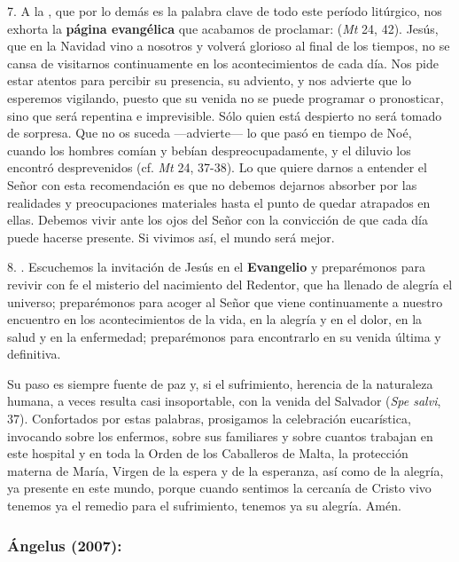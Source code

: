 \begin{body}
					7. A la , que por lo demás es la palabra clave de todo este período litúrgico, nos exhorta la \textbf{página evangélica} que acabamos de proclamar:  (\emph{Mt} 24, 42). Jesús, que en la Navidad vino a nosotros y volverá glorioso al final de los tiempos, no se cansa de visitarnos continuamente en los acontecimientos de cada día. Nos pide estar atentos para percibir su presencia, su adviento, y nos advierte que lo esperemos vigilando, puesto que su venida no se puede programar o pronosticar, sino que será repentina e imprevisible. Sólo quien está despierto no será tomado de sorpresa. Que no os suceda ---advierte--- lo que pasó en tiempo de Noé, cuando los hombres comían y bebían despreocupadamente, y el diluvio los encontró desprevenidos (cf. \emph{Mt} 24, 37-38). Lo que quiere darnos a entender el Señor con esta recomendación es que no debemos dejarnos absorber por las realidades y preocupaciones materiales hasta el punto de quedar atrapados en ellas. Debemos vivir ante los ojos del Señor con la convicción de que cada día puede hacerse presente. Si vivimos así, el mundo será mejor. 
					
					8. . Escuchemos la invitación de Jesús en el \textbf{Evangelio} y preparémonos para revivir con fe el misterio del nacimiento del Redentor, que ha llenado de alegría el universo; preparémonos para acoger al Señor que viene continuamente a nuestro encuentro en los acontecimientos de la vida, en la alegría y en el dolor, en la salud y en la enfermedad; preparémonos para encontrarlo en su venida última y definitiva. 
					
					Su paso es siempre fuente de paz y, si el sufrimiento, herencia de la naturaleza humana, a veces resulta casi insoportable, con la venida del Salvador  (\emph{Spe salvi}, 37). Confortados por estas palabras, prosigamos la celebración eucarística, invocando sobre los enfermos, sobre sus familiares y sobre cuantos trabajan en este hospital y en toda la Orden de los Caballeros de Malta, la protección materna de María, Virgen de la espera y de la esperanza, así como de la alegría, ya presente en este mundo, porque cuando sentimos la cercanía de Cristo vivo tenemos ya el remedio para el sufrimiento, tenemos ya su alegría. Amén.
				\end{body}
		
			\subsubsection{Ángelus (2007): }
			
